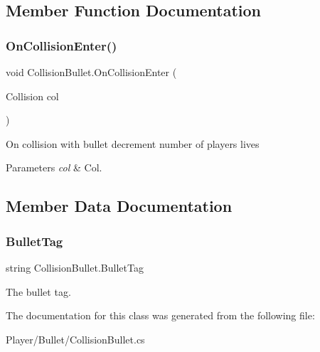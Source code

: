 \subsection{Member Function Documentation}
\mbox{\label{class_collision_bullet_a3267b5fa5550db284da7c7cbf25498f1}} 
\subsubsection{\texorpdfstring{On\+Collision\+Enter()}{OnCollisionEnter()}}
{\footnotesize\ttfamily void Collision\+Bullet.\+On\+Collision\+Enter (\begin{DoxyParamCaption}\item[{Collision}]{col }\end{DoxyParamCaption})\hspace{0.3cm}{\ttfamily [private]}}



On collision with bullet decrement number of player\textquotesingle{}s lives 


\begin{DoxyParams}{Parameters}
{\em col} & Col.\\
\hline
\end{DoxyParams}


\subsection{Member Data Documentation}
\mbox{\label{class_collision_bullet_a98c6bc7c9224385999fe1226cf3c1aee}} 
\subsubsection{\texorpdfstring{Bullet\+Tag}{BulletTag}}
{\footnotesize\ttfamily string Collision\+Bullet.\+Bullet\+Tag}



The bullet tag. 



The documentation for this class was generated from the following file\+:\begin{DoxyCompactItemize}
\item 
Player/\+Bullet/Collision\+Bullet.\+cs\end{DoxyCompactItemize}
